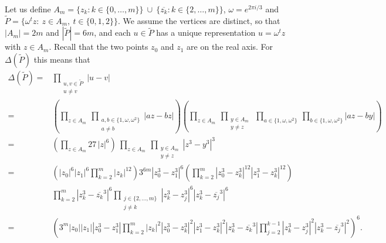 \documentclass{article}
\theoremstyle{definition}
\begin{document}
Let us define \(A_m=\{z_k: k\in\{0,\dots,m\}\}\ \cup\ \{\overline{z_k}: k\in\{2,\dots,m\}\}\), $\omega = e^{2\pi i/3}$ and $\widetilde{P}=\{\omega^t z:\ z\in A_m,\ t\in\{0,1,2\}\}$. We assume the vertices are distinct, so that \(|A_m|=2m\) and \(|\widetilde P|=6m\), and each \(u\in\widetilde P\) has a unique representation \(u=\omega^t z\) with \(z\in A_m\). Recall that the two points $z_0$ and $z_1$ are on the real axis. For \(\Delta(\widetilde{P})\) this means that
\begin{equation}\label{eq:DeltaDihedral}
\begin{aligned}
\Delta(\widetilde{P})=&\prod_{\substack{u,v\in \widetilde{P}\\u\neq v}}|u-v| \\
=&\left(\prod_{z\in A_m}\ \prod_{\substack{a,b\in\{1,\omega,\omega^2\}\\a\neq b}}|az-bz|\right)
\left(\prod_{z\in A_m}\ \prod_{\substack{y\in A_m\\y\neq z}}\ \prod_{a\in\{1,\omega,\omega^2\}}\ \prod_{b\in\{1,\omega,\omega^2\}}|az-by|\right)\\
=&\left(\prod_{z\in A_m} 27\,|z|^{6}\right)\ \prod_{z\in A_m}\ \prod_{\substack{y\in A_m\\y\neq z}} |z^3-y^3|^{3}\\
=&  \left(|z_0|^6|z_1|^6\prod_{k=2}^{m} |z_k|^{12}\right) 3^{6m} |z_0^3-z_1^3|^6  \left(\prod_{k=2}^{m} |z_0^3 - z_k^3|^{12} |z_1^3 -z_k^3|^{12} \right)\\
& \prod_{k=2}^{m} |z_k^3 -\overline{z_k}^3|^6 \prod_{\substack{ j \in \{2,...,m\}\\j\neq k}} |z_k^3 -z_j^3|^6  |z_k^3 - \overline{z_j}^3|^6 \\
=&\left(
3^{m}|z_0||z_1||z_0^3-z_1^3|\prod_{k=2}^{m} |z_k|^{2}  |z_0^3 - z_k^3|^2 |z_1^3 -z_k^3|^2 |z_k^3 -\overline{z_k}^3| \prod_{j=2}^{k-1} |z_k^3 -z_j^3|^2  |z_k^3 - \overline{z_j}^3|^2 
\right)^6.
\end{aligned}
\end{equation}
\end{document}

